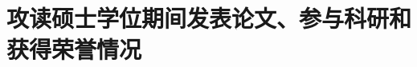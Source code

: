 \chapter*{\large 攻读硕士学位期间发表论文、参与科研和获得荣誉情况}
\vskip 2mm
\vspace{-1cm}
\renewcommand{\labelenumi}{[\arabic{enumi}]}




	
	
